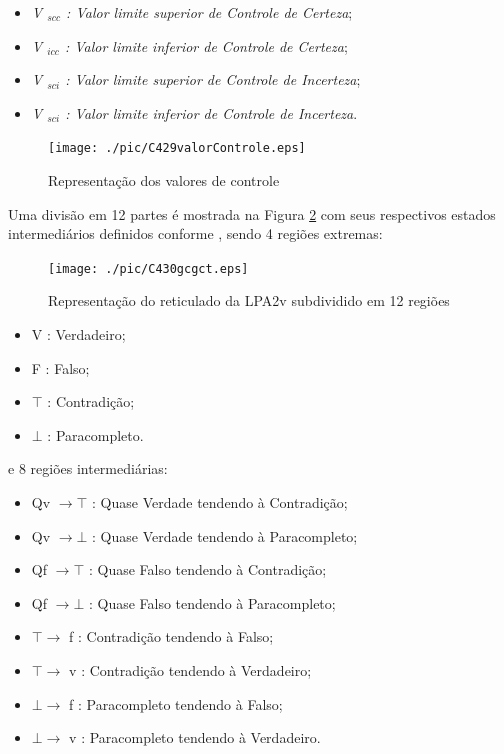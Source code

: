 \begin{itemize}
\item \emph{V $_{scc}$ : Valor limite superior de Controle de Certeza};
\item \emph{V $_{icc}$ : Valor limite inferior de Controle de Certeza};
\item \emph{V $_{sci}$ : Valor limite superior de Controle de Incerteza};
\item \emph{V $_{sci}$ : Valor limite inferior de Controle de Incerteza}.

\end{itemize}

\begin{figure}[!htb]
\center\texttt{[image: ./pic/C429valorControle.eps]}
\caption{Representação dos valores de controle}
\label{fig:valorControle}
\end{figure}

Uma divisão em 12 partes é mostrada na Figura \ref{fig:reticuladoLPA2v} com seus respectivos estados intermediários definidos conforme \cite{JoaoInacio}, sendo 4 regiões extremas:


\begin{figure}[!htb]
\center\texttt{[image: ./pic/C430gcgct.eps]}
\caption{Representação do reticulado da LPA2v subdividido em 12 regiões}
\label{fig:reticuladoLPA2v}
\end{figure}


\begin{itemize}
\item V : Verdadeiro;
\item F : Falso;
\item $\top$ : Contradição;
\item $\bot$ : Paracompleto.
\end{itemize}
e 8 regiões intermediárias: 
\begin{itemize}
\item Qv $\rightarrow  \top$ : Quase Verdade tendendo à Contradição;
\item Qv $\rightarrow  \bot$ : Quase Verdade tendendo à  Paracompleto;
\item Qf $\rightarrow  \top$ : Quase Falso tendendo à Contradição;
\item Qf $\rightarrow  \bot$ : Quase Falso tendendo à Paracompleto;
\item $\top \rightarrow $ f : Contradição tendendo à Falso;
\item $\top \rightarrow $ v : Contradição tendendo à Verdadeiro;
\item $\bot \rightarrow $ f : Paracompleto tendendo à Falso;
\item $\bot \rightarrow $ v : Paracompleto tendendo à Verdadeiro.

\end{itemize}


